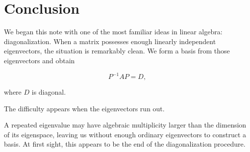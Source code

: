 \documentclass[11pt]{article}
\begin{document}

\section{Conclusion}

We began this note with one of the most familiar ideas in linear
algebra: diagonalization.  When a matrix possesses enough linearly
independent eigenvectors, the situation is remarkably clean.  We form
a basis from those eigenvectors and obtain

\[
P^{-1}AP=D,
\]

where \(D\) is diagonal.

The difficulty appears when the eigenvectors run out.

A repeated eigenvalue may have algebraic multiplicity larger than the
dimension of its eigenspace, leaving us without enough ordinary
eigenvectors to construct a basis.  At first sight, this appears to be
the end of the diagonalization procedure.
\end{document}
